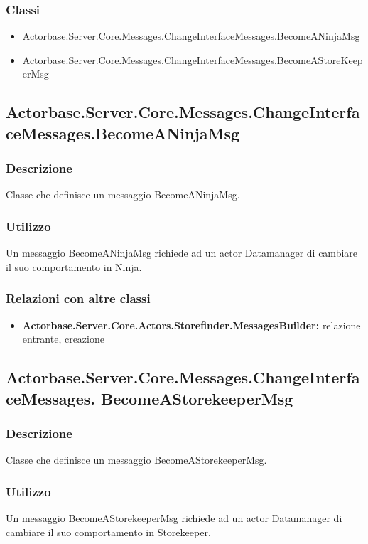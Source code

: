 \documentclass[a4paper]{article}
\begin{document}
			\subsubsection{Classi}
			\begin{itemize}
				\item Actorbase.Server.Core.Messages.ChangeInterfaceMessages.BecomeANinjaMsg
				\item Actorbase.Server.Core.Messages.ChangeInterfaceMessages.BecomeAStoreKeeperMsg
			\end{itemize}

			\subsection{Actorbase.Server.Core.Messages.ChangeInterfaceMessages.BecomeANinjaMsg}
			\subsubsection{Descrizione}
				Classe che definisce un messaggio BecomeANinjaMsg.
			\subsubsection{Utilizzo}
				Un messaggio BecomeANinjaMsg richiede ad un actor Datamanager di cambiare il suo comportamento in Ninja.
			\subsubsection{Relazioni con altre classi}
			\begin{itemize}
				\item \textbf{Actorbase.Server.Core.Actors.Storefinder.MessagesBuilder:} relazione entrante, creazione
			\end{itemize}

			\subsection{Actorbase.Server.Core.Messages.ChangeInterfaceMessages.
			BecomeAStorekeeperMsg}
			\subsubsection{Descrizione}
				Classe che definisce un messaggio BecomeAStorekeeperMsg.
			\subsubsection{Utilizzo}
				Un messaggio BecomeAStorekeeperMsg richiede ad un actor Datamanager di cambiare il suo comportamento in Storekeeper.
\end{document}
